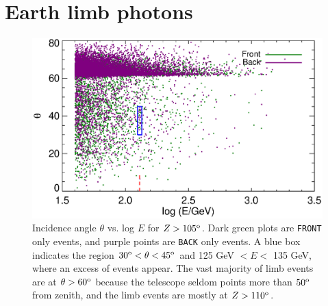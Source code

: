 \documentclass[aps,twocolumn,prd,superscriptaddress,showpacs,nofootinbib,fixfloat]{revtex4}
\newcommand{\degree}{^{\rm o}}
\begin{document}

\section{Earth limb photons}
\label{sec:EarthLimb}

\begin{figure}
  \centering
  \includegraphics[width=1.0\linewidth]{plots/theta-E-frontback.ps}
  \caption{Incidence angle $\theta$ vs. log $E$ for $Z >
    105\degree$.  Dark green plots are \texttt{FRONT} only
    events, and purple points are \texttt{BACK} only
    events. A blue box indicates the region $30\degree <
    \theta < 45\degree$ and 125 GeV $< E <$ 135 GeV, where
    an excess of events appear.  The vast majority of limb
    events are at $\theta > 60\degree$ because the telescope
    seldom points more than $50\degree$ from zenith, and the
    limb events are mostly at $Z>110\degree$. }
  \label{fig:theta-E-frontback}
\end{figure}
\end{document}
